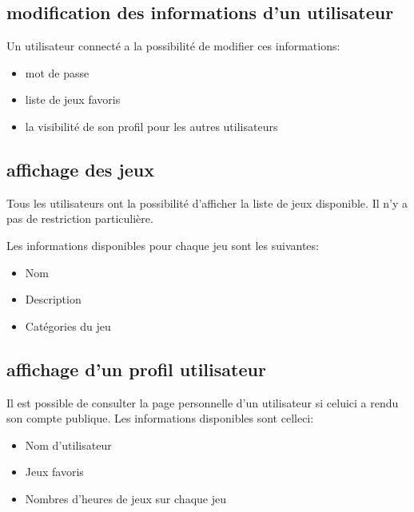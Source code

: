 \documentclass[a4paper,12pt,french]{sphinxmanual}
\begin{document}
\subsection{modification des informations d’un utilisateur}
\label{\detokenize{fonctionnelle:modification-des-informations-dun-utilisateur}}
\sphinxAtStartPar
Un utilisateur connecté a la possibilité de modifier ces informations:
\begin{itemize}
\item {} 
\sphinxAtStartPar
mot de passe

\item {} 
\sphinxAtStartPar
liste de jeux favoris

\item {} 
\sphinxAtStartPar
la visibilité de son profil pour les autres utilisateurs

\end{itemize}

\sphinxAtStartPar
{}


\subsection{affichage des jeux}
\label{\detokenize{fonctionnelle:affichage-des-jeux}}
\sphinxAtStartPar
Tous les utilisateurs ont la possibilité d’afficher la liste de jeux disponible. Il n’y a pas de restriction particulière.

\sphinxAtStartPar
Les informations disponibles pour chaque jeu sont les suivantes:
\begin{itemize}
\item {} 
\sphinxAtStartPar
Nom

\item {} 
\sphinxAtStartPar
Description

\item {} 
\sphinxAtStartPar
Catégories du jeu

\end{itemize}

\sphinxAtStartPar
{}


\subsection{affichage d’un profil utilisateur}
\label{\detokenize{fonctionnelle:affichage-dun-profil-utilisateur}}
\sphinxAtStartPar
Il est possible de consulter la page personnelle d’un utilisateur si celui\sphinxhyphen{}ci a rendu son compte publique. Les informations disponibles sont celle\sphinxhyphen{}ci:
\begin{itemize}
\item {} 
\sphinxAtStartPar
Nom d’utilisateur

\item {} 
\sphinxAtStartPar
Jeux favoris

\item {} 
\sphinxAtStartPar
Nombres d’heures de jeux sur chaque jeu

\end{itemize}
\end{document}
